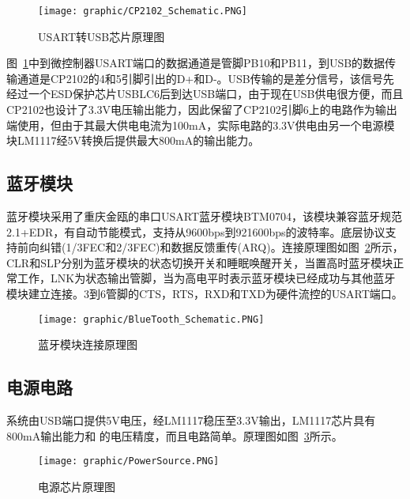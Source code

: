 \begin{figure}[!hbp]
\begin{center}
\texttt{[image: graphic/CP2102\_Schematic.PNG]}
\caption{USART转USB芯片原理图 \label{USART2USBSch}}
\end{center}
\end{figure}

图~\ref{USART2USBSch}中到微控制器USART端口的数据通道是管脚PB10和PB11，到USB的数据传输通道是CP2102的4和5引脚引出的D+和D-。USB传输的是差分信号，该信号先经过一个ESD保护芯片USBLC6后到达USB端口，由于现在USB供电很方便，而且CP2102也设计了3.3V电压输出能力，因此保留了CP2102引脚6上的电路作为输出端使用，但由于其最大供电电流为100mA，实际电路的3.3V供电由另一个电源模块LM1117经5V转换后提供最大800mA的输出能力。

\subsection{蓝牙模块\label{subsec:buletooth}}
	蓝牙模块采用了重庆金瓯的串口USART蓝牙模块BTM0704，该模块兼容蓝牙规范2.1+EDR，有自动节能模式，支持从9600bps到921600bps的波特率。底层协议支持前向纠错(1/3FEC和2/3FEC)和数据反馈重传(ARQ)。连接原理图如图~\ref{BlueToothConn}所示，CLR和SLP分别为蓝牙模块的状态切换开关和睡眠唤醒开关，当置高时蓝牙模块正常工作，LNK为状态输出管脚，当为高电平时表示蓝牙模块已经成功与其他蓝牙模块建立连接。3到6管脚的CTS，RTS，RXD和TXD为硬件流控的USART端口。


\begin{figure}[!hbp]
\begin{center}
\texttt{[image: graphic/BlueTooth\_Schematic.PNG]}
\caption{蓝牙模块连接原理图 \label{BlueToothConn}}
\end{center}
\end{figure}

\subsection{电源电路}
	系统由USB端口提供5V电压，经LM1117稳压至3.3V输出，LM1117芯片具有800mA输出能力和 的电压精度，而且电路简单。原理图如图~\ref{PowerSch}所示。

\begin{figure}[!hbp]
\begin{center}
\texttt{[image: graphic/PowerSource.PNG]}
\caption{电源芯片原理图 \label{PowerSch}}
\end{center}
\end{figure}


